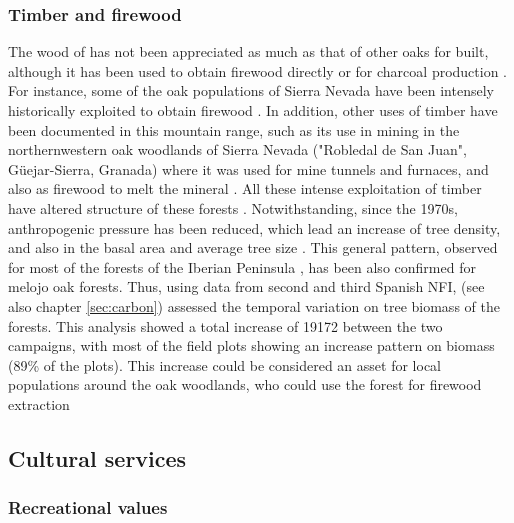\subsubsection{Timber and firewood}\label{sec:es:provision-timber}
The wood of \Qp has not been appreciated as much as that of other oaks for built, although it has been used to obtain firewood directly or for charcoal production \autocites{MontoyaMeson1979SituacionActual}. For instance, some of the oak populations of Sierra Nevada have been intensely historically exploited to obtain firewood \autocites[\emph{e.g.} Robledal de Cáñar,][]{ValbuenaCarabanaGil2013GeneticResilience,MorenoLlorcaetal2016HistoricalAnalysis}. In addition, other uses of timber have been documented in this mountain range, such as its use in mining in the northernwestern oak woodlands of Sierra Nevada ("Robledal de San Juan", Güejar-Sierra, Granada) where it was used for mine tunnels and furnaces, and also as firewood to melt the mineral \autocites{Titos1990}. All these intense exploitation of timber have altered structure of these forests \autocite{PerezLuqueetal2020LanduseLegacies}. Notwithstanding, since the 1970s, anthropogenic pressure has been reduced, which lead an increase of tree density, and also in the basal area and average tree size \autocite{GonzalezDiazetal2020BosquesEspanoles}. This general pattern, observed for most of the forests of the Iberian Peninsula \autocite{Astigarragaetal2020EvidenceNon,GonzalezDiazetal2020BosquesEspanoles}, has been also confirmed for melojo oak forests. Thus, using data from second and third Spanish NFI, \citet{PerezLuqueetal2021ManualGestion} (see also chapter \ref{sec:carbon}) assessed the temporal variation on tree biomass of the forests. This analysis showed a total increase of 19172 \mgha between the two campaigns, with most of the field plots showing an increase pattern on biomass (89\% of the plots). This increase could be considered an asset for local populations around the oak woodlands, who could use the forest for firewood extraction

\subsection{Cultural services}\label{sec:es:cultural}
\subsubsection{Recreational values}\label{sec:es:cultural-recreation}

